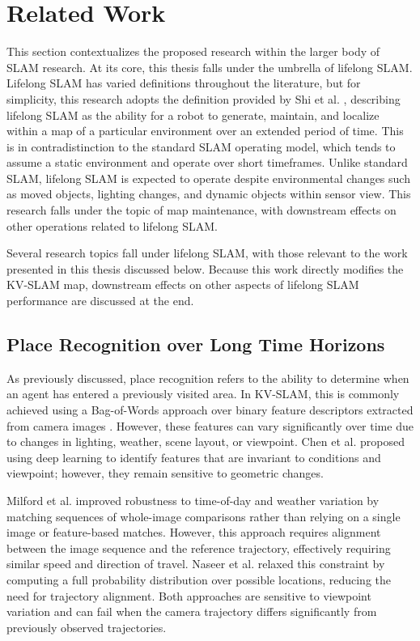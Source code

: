 \section{Related Work}
\label{sec:related_work}

This section contextualizes the proposed research within the larger body of SLAM research. At its core, this thesis falls under the umbrella of lifelong SLAM. Lifelong SLAM has varied definitions throughout the literature, but for simplicity, this research adopts the definition provided by Shi et al. \cite{shiAreWeReady2020}, describing lifelong SLAM as the ability for a robot to generate, maintain, and localize within a map of a particular environment over an extended period of time. This is in contradistinction to the standard SLAM operating model, which tends to assume a static environment and operate over short timeframes. Unlike standard SLAM, lifelong SLAM is expected to operate despite environmental changes such as moved objects, lighting changes, and dynamic objects within sensor view. This research falls under the topic of map maintenance, with downstream effects on other operations related to lifelong SLAM.

Several research topics fall under lifelong SLAM, with those relevant to the work presented in this thesis discussed below. Because this work directly modifies the KV-SLAM map, downstream effects on other aspects of lifelong SLAM performance are discussed at the end.

\subsection{Place Recognition over Long Time Horizons}

As previously discussed, place recognition refers to the ability to determine when an agent has entered a previously visited area. In KV-SLAM, this is commonly achieved using a Bag-of-Words approach over binary feature descriptors extracted from camera images \cite{camposORBSLAM3AccurateOpenSource2021}. However, these features can vary significantly over time due to changes in lighting, weather, scene layout, or viewpoint. Chen et al. \cite{chenDeepLearningFeatures2017} proposed using deep learning to identify features that are invariant to conditions and viewpoint; however, they remain sensitive to geometric changes.

Milford et al. improved robustness to time-of-day and weather variation by matching sequences of whole-image comparisons rather than relying on a single image or feature-based matches. However, this approach requires alignment between the image sequence and the reference trajectory, effectively requiring similar speed and direction of travel. Naseer et al. \cite{naseerVisionbasedMarkovLocalization2015} relaxed this constraint by computing a full probability distribution over possible locations, reducing the need for trajectory alignment. Both approaches are sensitive to viewpoint variation and can fail when the camera trajectory differs significantly from previously observed trajectories.

